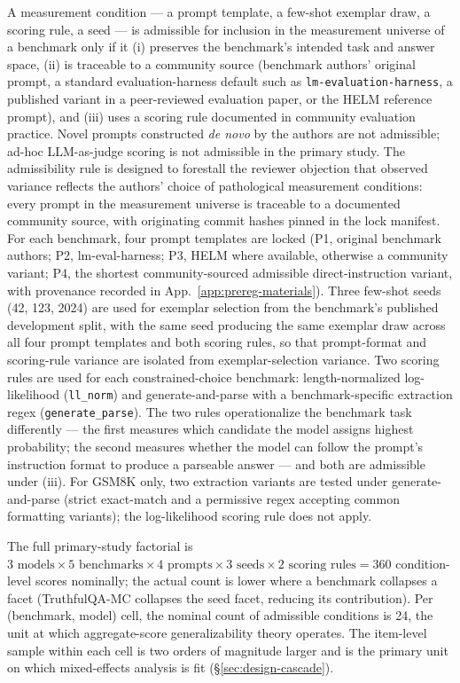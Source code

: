 \documentclass[11pt]{article}
\begin{document}
A measurement condition --- a prompt template, a few-shot exemplar
draw, a scoring rule, a seed --- is admissible for inclusion in
the measurement universe of a benchmark only if it (i) preserves
the benchmark's intended task and answer space, (ii) is traceable
to a community source (benchmark authors' original prompt, a
standard evaluation-harness default such as
\texttt{lm-evaluation-harness}, a published variant in a
peer-reviewed evaluation paper, or the HELM reference prompt),
and (iii) uses a scoring rule documented in community evaluation
practice. Novel prompts constructed \emph{de novo} by the authors
are not admissible; ad-hoc LLM-as-judge scoring is not admissible
in the primary study. The admissibility rule is designed to
forestall the reviewer objection that observed variance reflects
the authors' choice of pathological measurement conditions: every
prompt in the measurement universe is traceable to a documented
community source, with originating commit hashes pinned in the
lock manifest. For each benchmark, four prompt templates are
locked (P1, original benchmark authors; P2, lm-eval-harness;
P3, HELM where available, otherwise a community variant; P4, the
shortest community-sourced admissible direct-instruction variant,
with provenance recorded in App.~\ref{app:prereg-materials}).
Three few-shot seeds (42, 123, 2024) are used for exemplar
selection from the
benchmark's published development split, with the same seed
producing the same exemplar draw across all four prompt templates
and both scoring rules, so that prompt-format and scoring-rule
variance are isolated from exemplar-selection variance. Two scoring rules are used for each
constrained-choice benchmark: length-normalized log-likelihood
(\texttt{ll\_norm}) and generate-and-parse with a benchmark-specific
extraction regex (\texttt{generate\_parse}). The two rules
operationalize the benchmark task differently --- the first
measures which candidate the model assigns highest probability;
the second measures whether the model can follow the prompt's
instruction format to produce a parseable answer --- and both are
admissible under (iii). For GSM8K only, two extraction variants
are tested under generate-and-parse (strict exact-match and a
permissive regex accepting common formatting variants); the
log-likelihood scoring rule does not apply.

\begin{sloppypar}
The full primary-study factorial is $3 \text{ models} \times 5
\text{ benchmarks} \times 4 \text{ prompts} \times 3 \text{ seeds}
\times 2 \text{ scoring rules} = 360$ condition-level scores
nominally; the actual count is lower where a benchmark collapses a
facet (TruthfulQA-MC collapses the seed facet, reducing its
contribution). Per (benchmark, model) cell, the nominal count of
admissible conditions is 24, the unit at which aggregate-score
generalizability theory operates. The item-level sample within
each cell is two orders of magnitude larger and is the primary
unit on which mixed-effects analysis is fit
(§\ref{sec:design-cascade}).
\end{sloppypar}
\end{document}

